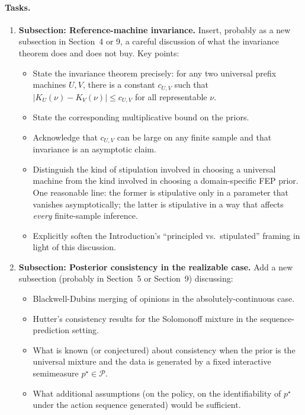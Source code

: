 \documentclass[11pt]{article}
\begin{document}
\paragraph{Tasks.}
\begin{enumerate}[leftmargin=*]
\item \textbf{Subsection: Reference-machine invariance.} Insert, probably as a new subsection in Section~4 or 9, a careful discussion of what the invariance theorem does and does not buy. Key points:
\begin{itemize}[leftmargin=*]
\item State the invariance theorem precisely: for any two universal prefix machines $U, V$, there is a constant $c_{U,V}$ such that $|K_U(\nu) - K_V(\nu)| \le c_{U,V}$ for all representable $\nu$.
\item State the corresponding multiplicative bound on the priors.
\item Acknowledge that $c_{U,V}$ can be large on any finite sample and that invariance is an asymptotic claim.
\item Distinguish the kind of stipulation involved in choosing a universal machine from the kind involved in choosing a domain-specific FEP prior. One reasonable line: the former is stipulative only in a parameter that vanishes asymptotically; the latter is stipulative in a way that affects \emph{every} finite-sample inference.
\item Explicitly soften the Introduction's ``principled vs.\ stipulated'' framing in light of this discussion.
\end{itemize}
\item \textbf{Subsection: Posterior consistency in the realizable case.} Add a new subsection (probably in Section~5 or Section~9) discussing:
\begin{itemize}[leftmargin=*]
\item Blackwell-Dubins merging of opinions in the absolutely-continuous case.
\item Hutter's consistency results for the Solomonoff mixture in the sequence-prediction setting.
\item What is known (or conjectured) about consistency when the prior is the universal mixture and the data is generated by a fixed interactive semimeasure $p^\star \in \mathcal{P}$.
\item What additional assumptions (on the policy, on the identifiability of $p^\star$ under the action sequence generated) would be sufficient.
\end{itemize}

\end{enumerate}
\end{document}

